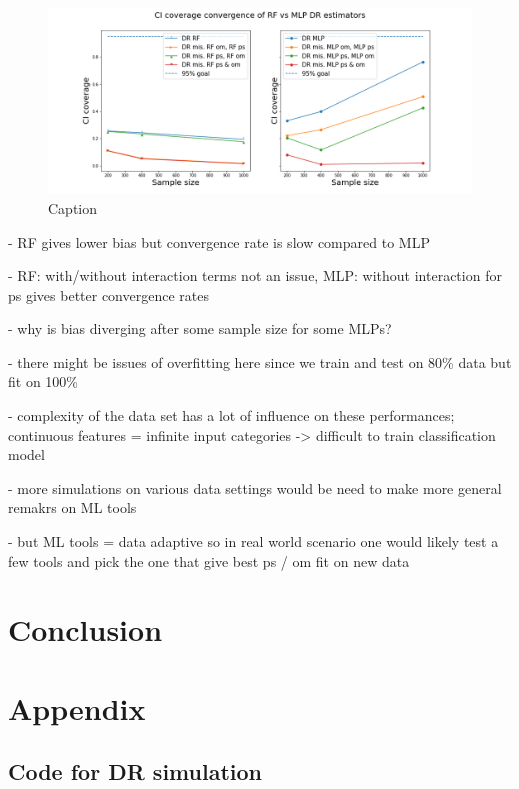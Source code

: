 \documentclass[12pt,twoside]{article}
\begin{document}
\begin{figure}[h!]
    \centering
    \includegraphics[width = 0.9\columnwidth]{figures/CIcompare_moreW.png}
    \caption{Caption}
    \label{fig:my_label}
\end{figure}


- RF gives lower bias but convergence rate is slow compared to MLP 

- RF: with/without interaction terms not an issue, MLP: without interaction for ps gives better convergence rates 

- why is bias diverging after some sample size for some MLPs?

- there might be issues of overfitting here since we train and test on 80\% data but fit on 100\%

- complexity of the data set has a lot of influence on these performances; continuous features = infinite input categories -> difficult to train classification model 

- more simulations on various data settings would be need to make more general remakrs on ML tools

- but ML tools = data adaptive so in real world scenario one would likely test a few tools and pick the one that give best ps / om fit on new data 

\section{Conclusion}

\clearpage



\clearpage
\section*{Appendix}

\subsection*{Code for DR simulation}


\end{document}
